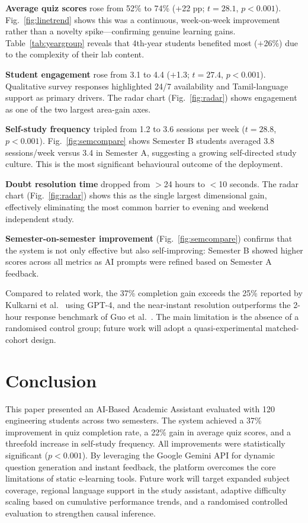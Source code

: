\documentclass[conference]{IEEEtran}
\begin{document}
\begin{table}[h]
\textbf{Average quiz scores} rose from 52\% to 74\% (+22 pp; $t=28.1$, $p<0.001$). Fig.~\ref{fig:linetrend} shows this was a continuous, week-on-week improvement rather than a novelty spike—confirming genuine learning gains. Table~\ref{tab:yeargroup} reveals that 4th-year students benefited most ($+$26\%) due to the complexity of their lab content.

\textbf{Student engagement} rose from 3.1 to 4.4 ($+$1.3; $t=27.4$, $p<0.001$). Qualitative survey responses highlighted 24/7 availability and Tamil-language support as primary drivers. The radar chart (Fig.~\ref{fig:radar}) shows engagement as one of the two largest area-gain axes.

\textbf{Self-study frequency} tripled from 1.2 to 3.6 sessions per week ($t=28.8$, $p<0.001$). Fig.~\ref{fig:semcompare} shows Semester B students averaged 3.8 sessions/week versus 3.4 in Semester A, suggesting a growing self-directed study culture. This is the most significant behavioural outcome of the deployment.

\textbf{Doubt resolution time} dropped from $>$24 hours to $<$10 seconds. The radar chart (Fig.~\ref{fig:radar}) shows this as the single largest dimensional gain, effectively eliminating the most common barrier to evening and weekend independent study.

\textbf{Semester-on-semester improvement} (Fig.~\ref{fig:semcompare}) confirms that the system is not only effective but also self-improving: Semester B showed higher scores across all metrics as AI prompts were refined based on Semester A feedback.

Compared to related work, the 37\% completion gain exceeds the 25\% reported by Kulkarni et al.~\cite{kulkarni2023} using GPT-4, and the near-instant resolution outperforms the 2-hour response benchmark of Guo et al.~\cite{guo2022}. The main limitation is the absence of a randomised control group; future work will adopt a quasi-experimental matched-cohort design.

\section{Conclusion}
\label{sec:conclusion}

This paper presented an AI-Based Academic Assistant evaluated with 120 engineering students across two semesters. The system achieved a 37\% improvement in quiz completion rate, a 22\% gain in average quiz scores, and a threefold increase in self-study frequency. All improvements were statistically significant ($p < 0.001$). By leveraging the Google Gemini API for dynamic question generation and instant feedback, the platform overcomes the core limitations of static e-learning tools. Future work will target expanded subject coverage, regional language support in the study assistant, adaptive difficulty scaling based on cumulative performance trends, and a randomised controlled evaluation to strengthen causal inference.


\end{table}
\end{document}
